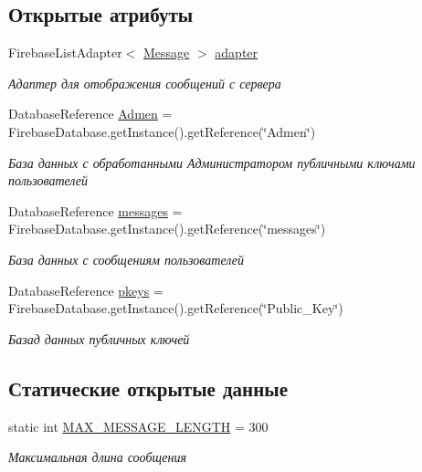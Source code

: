 \subsection*{Открытые атрибуты}
\begin{DoxyCompactItemize}
\item 
Firebase\+List\+Adapter$<$ \mbox{\hyperlink{classcom_1_1example_1_1firebasechat_1_1_message}{Message}} $>$ \mbox{\hyperlink{classcom_1_1example_1_1firebasechat_1_1_chat_room_aea339a52dcfcefb9f710a47548f37fed}{adapter}}
\begin{DoxyCompactList}\small\item\em Адаптер для отображения сообщений с сервера \end{DoxyCompactList}\item 
Database\+Reference \mbox{\hyperlink{classcom_1_1example_1_1firebasechat_1_1_chat_room_af6807d5446ac002a074f0ad11724ce71}{Admen}} = Firebase\+Database.\+get\+Instance().get\+Reference(\char`\"{}Admen\char`\"{})
\begin{DoxyCompactList}\small\item\em База данных с обработанными Администратором публичными ключами пользователей \end{DoxyCompactList}\item 
Database\+Reference \mbox{\hyperlink{classcom_1_1example_1_1firebasechat_1_1_chat_room_adb882b49c6dbcbe1508d090eb2507505}{messages}} = Firebase\+Database.\+get\+Instance().get\+Reference(\char`\"{}messages\char`\"{})
\begin{DoxyCompactList}\small\item\em База данных с сообщениям пользователей \end{DoxyCompactList}\item 
Database\+Reference \mbox{\hyperlink{classcom_1_1example_1_1firebasechat_1_1_chat_room_ad3a0dbe421eb87403be4582e54eac253}{pkeys}} = Firebase\+Database.\+get\+Instance().get\+Reference(\char`\"{}Public\+\_\+\+Key\char`\"{})
\begin{DoxyCompactList}\small\item\em Базад данных публичных ключей \end{DoxyCompactList}\end{DoxyCompactItemize}
\subsection*{Статические открытые данные}
\begin{DoxyCompactItemize}
\item 
static int \mbox{\hyperlink{classcom_1_1example_1_1firebasechat_1_1_chat_room_a16b9729a48a21196941e042b2768cb26}{M\+A\+X\+\_\+\+M\+E\+S\+S\+A\+G\+E\+\_\+\+L\+E\+N\+G\+TH}} = 300
\begin{DoxyCompactList}\small\item\em Максимальная длина сообщения \end{DoxyCompactList}\end{DoxyCompactItemize}
